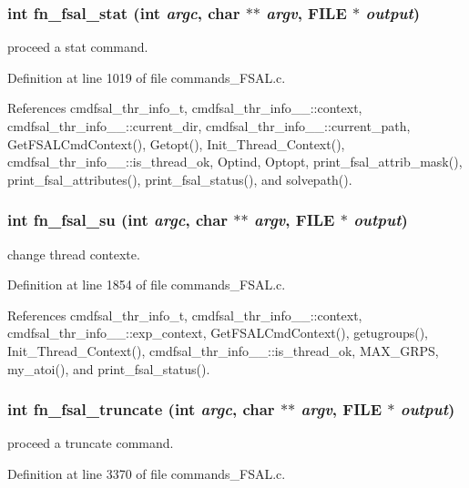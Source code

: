 \subsubsection{\setlength{\rightskip}{0pt plus 5cm}int fn\_\-fsal\_\-stat (int {\em argc}, char $\ast$$\ast$ {\em argv}, FILE $\ast$ {\em output})}\label{commands__FSAL_8c_a21}


proceed a stat command. 

Definition at line 1019 of file commands\_\-FSAL.c.

References cmdfsal\_\-thr\_\-info\_\-t, cmdfsal\_\-thr\_\-info\_\-\_\-::context, cmdfsal\_\-thr\_\-info\_\-\_\-::current\_\-dir, cmdfsal\_\-thr\_\-info\_\-\_\-::current\_\-path, Get\-FSALCmd\-Context(), Getopt(), Init\_\-Thread\_\-Context(), cmdfsal\_\-thr\_\-info\_\-\_\-::is\_\-thread\_\-ok, Optind, Optopt, print\_\-fsal\_\-attrib\_\-mask(), print\_\-fsal\_\-attributes(), print\_\-fsal\_\-status(), and solvepath().
\subsubsection{\setlength{\rightskip}{0pt plus 5cm}int fn\_\-fsal\_\-su (int {\em argc}, char $\ast$$\ast$ {\em argv}, FILE $\ast$ {\em output})}\label{commands__FSAL_8c_a26}


change thread contexte. 

Definition at line 1854 of file commands\_\-FSAL.c.

References cmdfsal\_\-thr\_\-info\_\-t, cmdfsal\_\-thr\_\-info\_\-\_\-::context, cmdfsal\_\-thr\_\-info\_\-\_\-::exp\_\-context, Get\-FSALCmd\-Context(), getugroups(), Init\_\-Thread\_\-Context(), cmdfsal\_\-thr\_\-info\_\-\_\-::is\_\-thread\_\-ok, MAX\_\-GRPS, my\_\-atoi(), and print\_\-fsal\_\-status().
\subsubsection{\setlength{\rightskip}{0pt plus 5cm}int fn\_\-fsal\_\-truncate (int {\em argc}, char $\ast$$\ast$ {\em argv}, FILE $\ast$ {\em output})}\label{commands__FSAL_8c_a35}


proceed a truncate command. 

Definition at line 3370 of file commands\_\-FSAL.c.

